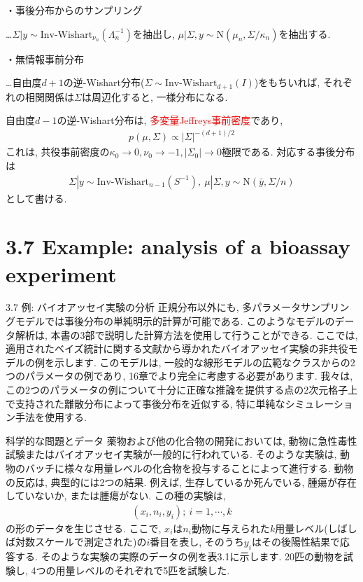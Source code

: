 \documentclass[10pt,dvipdfmx,a4]{beamer}
\newcommand{\eqn}[1]{\begin{align*}#1\end{align*}}
\newcommand{\tcr}[1]{\textcolor{red}{#1}}
\begin{document}

\begin{frame}[t]
・事後分布からのサンプリング

…$\Sigma|y\sim \text{Inv-Wishart}_{\nu_n}(\Lambda^{- 1}_n)$を抽出し, $\mu|\Sigma,y\sim \text{N}(\mu_n, \Sigma/\kappa_n)$を抽出する.

・無情報事前分布

…自由度$d+1$の逆-Wishart分布($\Sigma\sim\text{Inv-Wishart}_{d+1}(I)$)をもちいれば, それぞれの相関関係は$\Sigma$は周辺化すると, 一様分布になる.

自由度$d-1$の逆-Wishart分布は, \tcr{多変量Jeffreys事前密度}であり,
\eqn{p(\mu,\Sigma)\propto|\Sigma|^{-(d+1)/2}}
これは, 共役事前密度の$\kappa_0\rightarrow 0, \nu_0\rightarrow -1, |\Sigma_0|\rightarrow 0$極限である.
対応する事後分布は
\eqn{\Sigma|y\sim \text{Inv-Wishart}_{n-1}(S^{-1}),\ \mu|\Sigma, y\sim \text{N}(\bar{y},\Sigma/n)}
として書ける.
\end{frame}

\section{3.7 Example: analysis of a bioassay experiment}
\begin{frame}{3.7 例: バイオアッセイ実験の分析}
正規分布以外にも, 多パラメータサンプリングモデルでは事後分布の単純明示的計算が可能である.
このようなモデルのデータ解析は, 本書の3部で説明した計算方法を使用して行うことができる.
ここでは, 適用されたベイズ統計に関する文献から導かれたバイオアッセイ実験の非共役モデルの例を示します.
このモデルは, 一般的な線形モデルの広範なクラスからの2つのパラメータの例であり, 16章でより完全に考慮する必要があります.
我々は, この2つのパラメータの例について十分に正確な推論を提供する点の2次元格子上で支持された離散分布によって事後分布を近似する, 特に単純なシミュレーション手法を使用する.
\end{frame}


\begin{frame}{科学的な問題とデータ}
薬物および他の化合物の開発においては, 動物に急性毒性試験またはバイオアッセイ実験が一般的に行われている.
そのような実験は, 動物のバッチに様々な用量レベルの化合物を投与することによって進行する.
動物の反応は, 典型的には2つの結果.
例えば, 生存しているか死んでいる, 腫瘍が存在していないか, または腫瘍がない.
この種の実験は,
\eqn{(x_i,n_i,y_i);\ i=1,\cdots,k}
の形のデータを生じさせる.
ここで, $x_i$は$n_i$動物に与えられた$k$用量レベル(しばしば対数スケールで測定された)の$i$番目を表し, そのうち$y_i$はその後陽性結果で応答する.
そのような実験の実際のデータの例を表3.1に示します.
20匹の動物を試験し, 4つの用量レベルのそれぞれで5匹を試験した.
\end{frame}
\end{document}

